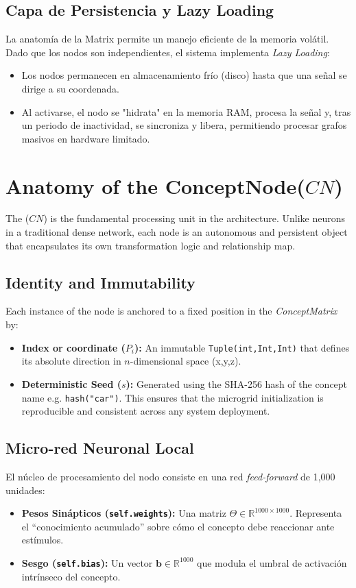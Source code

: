 \documentclass[12pt]{article}
\begin{document}
\subsection{Capa de Persistencia y Lazy Loading}
La anatomía de la Matrix permite un manejo eficiente de la memoria volátil. Dado que los nodos son independientes, el sistema implementa \textit{Lazy Loading}:
\begin{itemize}
	\item Los nodos permanecen en almacenamiento frío (disco) hasta que una señal se dirige a su coordenada.
	\item Al activarse, el nodo se "hidrata" en la memoria RAM, procesa la señal y, tras un periodo de inactividad, se sincroniza y libera, permitiendo procesar grafos masivos en hardware limitado.
\end{itemize}


\section{Anatomy of the ConceptNode($CN$)}

The ($CN$) is the fundamental processing unit in the architecture. Unlike neurons in a traditional dense network,
each node is an autonomous and persistent object that encapsulates its own transformation logic and relationship map.

\subsection{Identity and Immutability}

Each instance of the node is anchored to a fixed position in the \textit{ConceptMatrix} by:
\begin{itemize}
    \item \textbf{Index or coordinate ($P_i$):} An immutable \texttt{Tuple(int,Int,Int)} that defines its absolute direction in $n$-dimensional space (x,y,z).
    \item \textbf{Deterministic Seed ($s$):} Generated using the SHA-256 hash of the concept name e.g. \texttt{hash("car")}. This ensures that the microgrid initialization is reproducible and consistent across any system deployment.
\end{itemize}

\subsection{Micro-red Neuronal Local }
El núcleo de procesamiento del nodo consiste en una red \textit{feed-forward} de 1,000 unidades:
\begin{itemize}
    \item \textbf{Pesos Sinápticos (\texttt{self.weights}):} Una matriz $\Theta \in \mathbb{R}^{1000 \times 1000}$. Representa el ``conocimiento acumulado'' sobre cómo el concepto debe reaccionar ante estímulos.
    \item \textbf{Sesgo (\texttt{self.bias}):} Un vector $\bm{b} \in \mathbb{R}^{1000}$ que modula el umbral de activación intrínseco del concepto.
\end{itemize}
\end{document}
